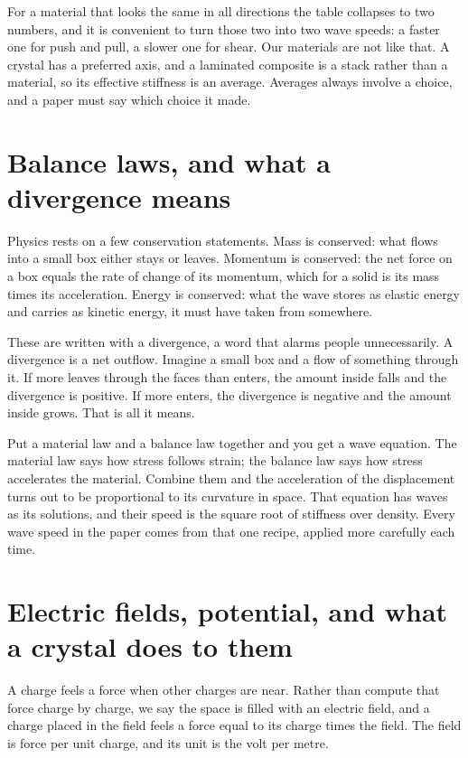 \documentclass[11pt]{article}
\begin{document}
For a material that looks the same in all directions the table collapses to two numbers, and it is convenient
to turn those two into two wave speeds: a faster one for push and pull, a slower one for shear. Our materials
are not like that. A crystal has a preferred axis, and a laminated composite is a stack rather than a
material, so its effective stiffness is an average. Averages always involve a choice, and a paper must say
which choice it made.

\section{Balance laws, and what a divergence means}

Physics rests on a few conservation statements. Mass is conserved: what flows into a small box either stays or
leaves. Momentum is conserved: the net force on a box equals the rate of change of its momentum, which for a
solid is its mass times its acceleration. Energy is conserved: what the wave stores as elastic energy and
carries as kinetic energy, it must have taken from somewhere.

These are written with a divergence, a word that alarms people unnecessarily. A divergence is a net outflow.
Imagine a small box and a flow of something through it. If more leaves through the faces than enters, the
amount inside falls and the divergence is positive. If more enters, the divergence is negative and the amount
inside grows. That is all it means.

Put a material law and a balance law together and you get a wave equation. The material law says how stress
follows strain; the balance law says how stress accelerates the material. Combine them and the acceleration
of the displacement turns out to be proportional to its curvature in space. That equation has waves as its
solutions, and their speed is the square root of stiffness over density. Every wave speed in the paper comes
from that one recipe, applied more carefully each time.

\section{Electric fields, potential, and what a crystal does to them}

A charge feels a force when other charges are near. Rather than compute that force charge by charge, we say
the space is filled with an electric field, and a charge placed in the field feels a force equal to its charge
times the field. The field is force per unit charge, and its unit is the volt per metre.
\end{document}
